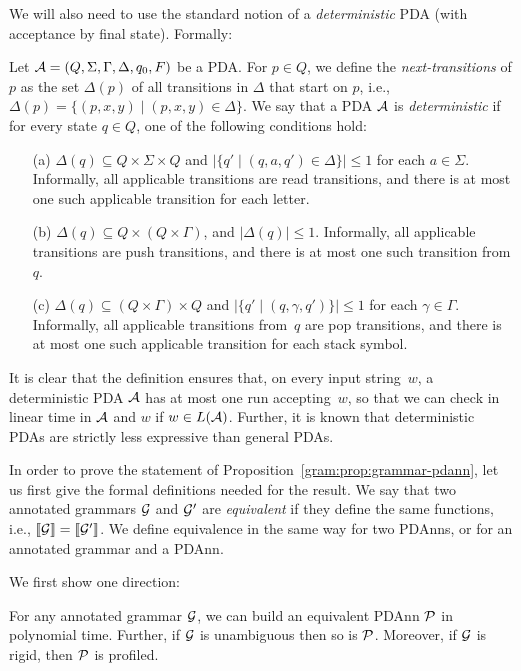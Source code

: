 We will also need to use the standard notion of a \emph{deterministic} PDA (with
acceptance by final state). Formally:
\begin{definition}
  \label{gram:def:dpda}
  Let $\mathcal{A} = (Q, \Sigma, \Gamma, \Delta, q_0, F)$ be a PDA. For $p \in Q$, we define the \emph{next-transitions} of $p$ as the set $\Delta(p)$ of all transitions in $\Delta$ that start on $p$, i.e.,  $\Delta(p) = \{(p, x, y) \mid (p, x, y) \in \Delta\}$.
  We say that a PDA $\mathcal{A}$ is \emph{deterministic} if
%
%
%
%
%
%
%
%
%
%
%
%
%
%
%
for every state $q \in Q$, one of the following conditions hold:
\begin{itemize}
	\item[(a)] $\Delta(q) \subseteq Q \times \Sigma \times Q$ and $|\{q'\mid
          (q, a, q')\in \Delta\}| \leq 1$ for each $a\in\Sigma$. Informally, all
          applicable transitions are read transitions, and there is at most one such
          applicable transition for each letter.
	\item[(b)] $\Delta(q) \subseteq Q \times (Q \times \Gamma)$, and
          $|\Delta(q)| \leq 1$. Informally, all applicable transitions are push
          transitions, and there is at most one such transition from $q$.
	\item[(c)] $\Delta(q) \subseteq (Q \times \Gamma) \times Q$ and
          $|\{q'\mid (q, \gamma, q')\}| \leq 1$ for each $\gamma \in \Gamma$.
          Informally, all applicable
          transitions from~$q$ are pop transitions, and there is at most one
          such applicable transition for each stack symbol.
\end{itemize}
\end{definition}

It is clear that the definition ensures that, on every input string~$w$, a
deterministic PDA $\mathcal{A}$ has at most one run accepting~$w$, so that we can
check in linear time in $\mathcal{A}$ and $w$ if $w \in L(\mathcal{A})$. Further, it is known that
deterministic PDAs are strictly less expressive than general PDAs.


In order to prove the statement of Proposition~\ref{gram:prop:grammar-pdann}, let us first give the formal definitions needed for  the result.
We say that two annotated grammars
$\mathcal{G}$ and $\mathcal{G}'$ are \emph{equivalent} if they define the same functions, i.e.,
${\llbracket{\mathcal{G}}\rrbracket} = {\llbracket{\mathcal{G}'}\rrbracket}$. We define equivalence in the same way for two PDAnns, or
for an annotated grammar and a PDAnn.

We first show one direction:

\begin{claim}
	\label{gram:prp:g2pdt}
	For any annotated grammar $\mathcal{G}$, we can build an equivalent PDAnn $\mathcal{P}$ in polynomial
	time. Further, if $\mathcal{G}$ is unambiguous then so is $\mathcal{P}$. Moreover, if $\mathcal{G}$ is rigid, then $\mathcal{P}$ is profiled.
\end{claim}

